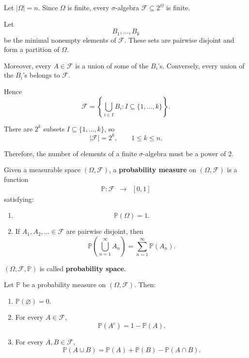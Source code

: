 \begin{solutionenv}
    Let $|\Omega|=n$. Since $\Omega$ is finite, every $\sigma$-algebra
    $\mathcal{F}\subseteq 2^\Omega$ is finite.

    Let
    \[
    B_1,\ldots,B_k
    \]
    be the minimal nonempty elements of $\mathcal{F}$.
    These sets are pairwise disjoint and form a partition of $\Omega$.

    Moreover, every $A\in\mathcal{F}$ is a union of some of the
    $B_i$'s. Conversely, every union of the $B_i$'s belongs to
    $\mathcal{F}$.

    Hence
    \[
    \mathcal{F}
    =
    \left\{
        \bigcup_{i\in I} B_i:
        I\subseteq\{1,\ldots,k\}
    \right\}.
    \]

    There are $2^k$ subsets $I\subseteq\{1,\ldots,k\}$, so
    \[
    |\mathcal{F}|=2^k,
    \qquad 1\le k\le n.
    \]

    Therefore, the number of elements of a finite $\sigma$-algebra
    must be a power of $2$.
\end{solutionenv}

\begin{definitionenv}
    Given a measurable space $(\Omega,\mathcal{F})$, a \textbf{probability measure}
    on $(\Omega,\mathcal{F})$ is a function
    \[
        \begin{array}{rcl}
            \mathbb{P}:\mathcal{F} &\longrightarrow& [0,1]
        \end{array}
    \]
    satisfying:
    \begin{enumerate}[label=(\alph*)]
        \item
        \[
            \mathbb{P}(\Omega)=1.
        \]

        \item If $A_1,A_2,\ldots\in\mathcal{F}$ are pairwise disjoint, then
        \[
            \mathbb{P}\left(\bigcup_{n=1}^{\infty}A_n\right)
            =\sum_{n=1}^{\infty}\mathbb{P}(A_n).
        \]
    \end{enumerate}

    $(\Omega,\mathcal{F},\mathbb{P})$ is  called \textbf{probability space}.
\end{definitionenv}

\begin{propositionenv}
    Let $\mathbb{P}$ be a probability measure on $(\Omega,\mathcal{F})$. Then:
    \begin{enumerate}[label=(\arabic*)]
        \item $\mathbb{P}(\varnothing)=0$.
        \item For every $A\in\mathcal{F}$,
        \[
            \mathbb{P}(A^c)=1-\mathbb{P}(A).
        \]
        \item For every $A,B\in\mathcal{F}$,
        \[
            \mathbb{P}(A\cup B)=\mathbb{P}(A)+\mathbb{P}(B)-\mathbb{P}(A\cap B).
        \]
    \end{enumerate}
\end{propositionenv}

